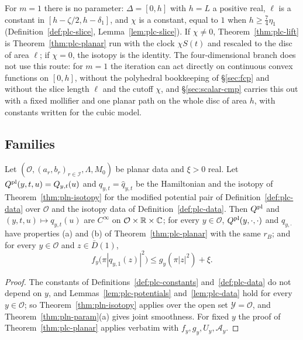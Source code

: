 \begin{remark}\label{rem:plc-scaling}
For $m=1$ there is no parameter: $\Delta=[0,h]$ with $h=L$ a positive real, $\ell$ is a constant in
$[h-\zeta/2,h-\delta_1]$, and $\chi$ is a constant, equal to $1$ when $h\ge\frac74\eta_1$ (Definition~\ref{def:plc-slice},
Lemma~\ref{lem:plc-slice}). If $\chi\ne0$, Theorem~\ref{thm:plc-lift} is Theorem~\ref{thm:plc-planar} run with the clock
$\chi S(t)$ and rescaled to the disc of area $\ell$; if $\chi=0$, the isotopy is the identity. The four-dimensional branch does not use this route: for $m=1$ the iteration can act directly on continuous convex
functions on $[0,h]$, without the polyhedral bookkeeping of \S\ref{sec:fcp} and without the slice length $\ell$ and the
cutoff $\chi$, and \S\ref{sec:scalar-cmp} carries this out with a fixed mollifier and one planar path on the whole disc of
area $h$, with constants written for the cubic model.
\end{remark}

\subsection{Families}\label{sec:plc-param}

\begin{theorem}\label{thm:plc-param}
Let $(\mathcal O,(a_r,b_r)_{r\in\mathcal I},\Lambda,M_0)$ be planar data and $\xi>0$ real. Let $Q^{\rm pl}(y,t,u)=Q_{y,t}(u)$ and
$q_{y,t}=\hat q_{y,t}$ be the Hamiltonian and the isotopy of Theorem~\ref{thm:pln-isotopy} for the modified potential pair of
Definition~\ref{def:plc-data} over $\mathcal O$ and the isotopy data of Definition~\ref{def:plc-data}. Then
$Q^{\rm pl}$ and $(y,t,u)\mapsto q_{y,t}(u)$ are $C^\infty$ on $\mathcal O\times\mathbb{R}\times\mathbb{C}$; for every $y\in\mathcal O$,
$Q^{\rm pl}(y,\cdot,\cdot)$ and $q_{y,\cdot}$ have properties (a) and (b) of Theorem~\ref{thm:plc-planar} with the same $r_B$;
and for every $y\in\mathcal O$ and $z\in\bar D(1)$,
\[
 f_y\bigl(\pi|q_{y,1}(z)|^2\bigr)\le g_y(\pi|z|^2)+\xi .
\]
\end{theorem}

\begin{proof}
The constants of Definitions~\ref{def:plc-constants} and~\ref{def:plc-data} do not depend on $y$, and
Lemmas~\ref{lem:plc-potentials} and~\ref{lem:plc-data} hold for every $y\in\mathcal O$; so Theorem~\ref{thm:pln-isotopy} applies
over the open set $\mathcal Y=\mathcal O$, and Theorem~\ref{thm:pln-param}(a) gives joint smoothness. For fixed $y$ the proof of
Theorem~\ref{thm:plc-planar} applies verbatim with $f_y,g_y,U_y,\mathcal A_y$.
\end{proof}

